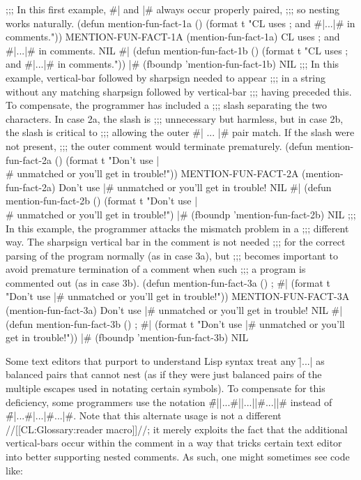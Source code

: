 ;;; In this first example, #| and |# always occur properly paired,
;;; so nesting works naturally.
 (defun mention-fun-fact-1a ()
   (format t "CL uses ; and #|...|# in comments."))
\EV MENTION-FUN-FACT-1A
 (mention-fun-fact-1a)
\OUT CL uses ; and #|...|# in comments.
\EV NIL
 #| (defun mention-fun-fact-1b ()
      (format t "CL uses ; and #|...|# in comments.")) |#
 (fboundp 'mention-fun-fact-1b) \EV NIL
\goodbreak
;;; In this example, vertical-bar followed by sharpsign needed to appear
;;; in a string without any matching sharpsign followed by vertical-bar
;;; having preceded this.  To compensate, the programmer has included a
;;; slash separating the two characters.  In case 2a, the slash is 
;;; unnecessary but harmless, but in case 2b, the slash is critical to
;;; allowing the outer #| ... |# pair match.  If the slash were not present,
;;; the outer comment would terminate prematurely.
 (defun mention-fun-fact-2a ()
   (format t "Don't use |\\# unmatched or you'll get in trouble!"))
\EV MENTION-FUN-FACT-2A
 (mention-fun-fact-2a)
\OUT Don't use |# unmatched or you'll get in trouble!
\EV NIL
 #| (defun mention-fun-fact-2b ()
      (format t "Don't use |\\# unmatched or you'll get in trouble!") |#
 (fboundp 'mention-fun-fact-2b) \EV NIL
\goodbreak
;;; In this example, the programmer attacks the mismatch problem in a
;;; different way.  The sharpsign vertical bar in the comment is not needed
;;; for the correct parsing of the program normally (as in case 3a), but 
;;; becomes important to avoid premature termination of a comment when such 
;;; a program is commented out (as in case 3b).
 (defun mention-fun-fact-3a () ; #|
   (format t "Don't use |# unmatched or you'll get in trouble!"))
\EV MENTION-FUN-FACT-3A
 (mention-fun-fact-3a)
\OUT Don't use |# unmatched or you'll get in trouble!
\EV NIL
 #|
 (defun mention-fun-fact-3b () ; #|
   (format t "Don't use |# unmatched or you'll get in trouble!"))
 |#
 (fboundp 'mention-fun-fact-3b) \EV NIL
\endcode

\endsubsubsubsection%


Some text editors that purport to understand Lisp syntax treat any \f{|...|}
as balanced pairs that cannot nest (as if they were just balanced pairs of 
the multiple escapes used in notating certain symbols).  To compensate for 
this deficiency, some programmers use the notation \f{\#||...\#||...||\#...||\#}
instead of \f{\#|...\#|...|\#...|\#}.   Note that this alternate usage is not
a different //[[CL:Glossary:reader macro]]//; it merely exploits the fact that the additional
vertical-bars occur within the comment in a way that tricks certain text editor
into better supporting nested comments.  As such, one might sometimes see code
like:

